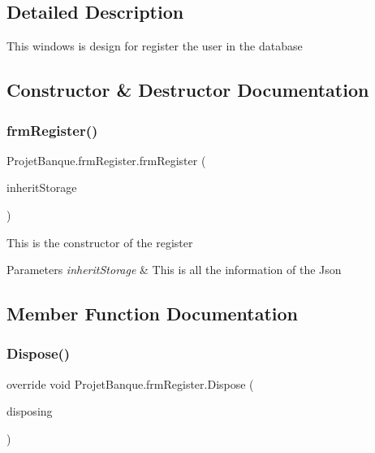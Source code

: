 \subsection{Detailed Description}
This windows is design for register the user in the database 



\subsection{Constructor \& Destructor Documentation}
\mbox{\label{class_projet_banque_1_1frm_register_ad442e56ec83d3aef24ae712135291931}} 
\subsubsection{\texorpdfstring{frmRegister()}{frmRegister()}}
{\footnotesize\ttfamily Projet\+Banque.\+frm\+Register.\+frm\+Register (\begin{DoxyParamCaption}\item[{\mbox{\hyperlink{class_projet_banque_1_1_json_data}{Json\+Data}}}]{inherit\+Storage }\end{DoxyParamCaption})}



This is the constructor of the register 


\begin{DoxyParams}{Parameters}
{\em inherit\+Storage} & This is all the information of the Json\\
\hline
\end{DoxyParams}


\subsection{Member Function Documentation}
\mbox{\label{class_projet_banque_1_1frm_register_a243860ddb36ba23a63c3e6ecedb33bc6}} 
\subsubsection{\texorpdfstring{Dispose()}{Dispose()}}
{\footnotesize\ttfamily override void Projet\+Banque.\+frm\+Register.\+Dispose (\begin{DoxyParamCaption}\item[{bool}]{disposing }\end{DoxyParamCaption})\hspace{0.3cm}{\ttfamily [protected]}}



